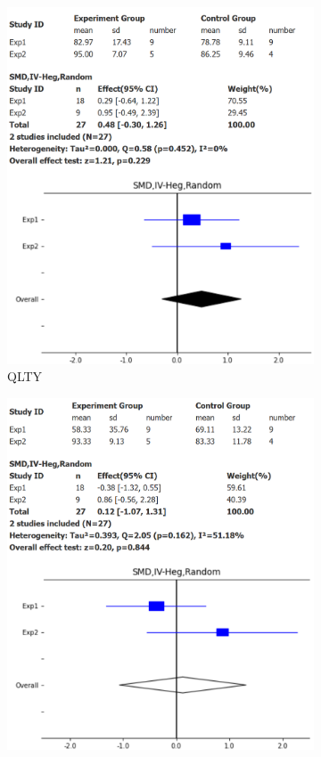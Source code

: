 \begin{figure}[H]
    \begin{subfigure}{0.49\textwidth}
        \includegraphics[width=\linewidth]{figures/forest_plots/QLTY.png}
        \caption{QLTY}
        \label{fp_qlty}
    \end{subfigure}\hfil
    \begin{subfigure}{0.49\textwidth}
        \includegraphics[width=\linewidth]{figures/forest_plots/PROD.png}

\end{subfigure}
\end{figure}
